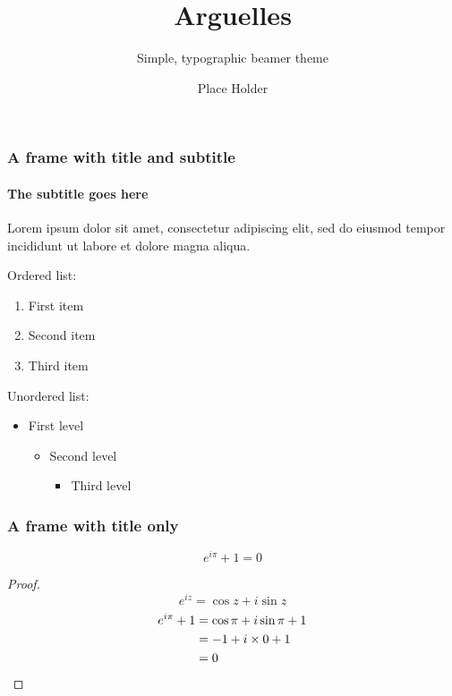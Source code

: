 \documentclass{beamer}
\title{Arguelles}
\subtitle{Simple, typographic beamer theme}
\date{}
\author{Place Holder}
\institute{University of \TeX\par\email{username@domain.com}}
\begin{document}
\frame[plain]{\titlepage}


\begin{frame}
 \frametitle{A frame with title and subtitle}
 \framesubtitle{The subtitle goes here}
 Lorem ipsum dolor sit amet, consectetur adipiscing elit, sed do eiusmod tempor incididunt ut labore et dolore magna aliqua.\par
 \vfill
 Ordered list:
 \begin{enumerate}
  \item First item
  \item Second item
  \item Third item
 \end{enumerate}
 \vfill
 Unordered list:
 \begin{itemize}
  \item First level
        \begin{itemize}
         \item Second level
               \begin{itemize}
                \item Third level
               \end{itemize}
        \end{itemize}
 \end{itemize}
\end{frame}

\begin{frame}
 \frametitle{A frame with title only}
 \begin{theorem}
  \[e^{i\pi}+1=0\]
  \begin{proof}
   \begin{equation*}
    e^{iz}=\cos{z}+i\sin{z}
   \end{equation*}
   \begin{align*}
    e^{i\pi}+1 & \null=\cos\pi+i\sin\pi+1 \\
               & \null=-1+i\times0+1      \\
               & \null=0
   \end{align*}
  \end{proof}
 \end{theorem}
\end{frame}
\end{document}
